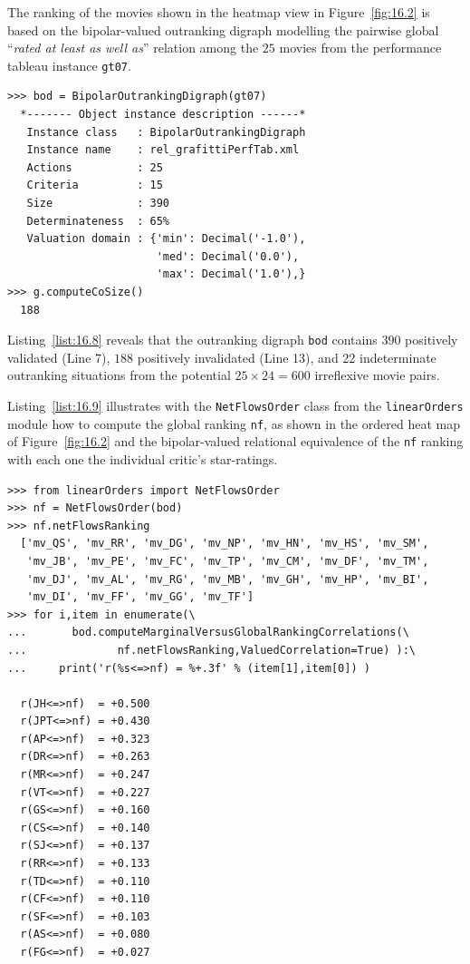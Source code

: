 The \NetFlows ranking of the movies shown in the heatmap view in Figure~\vref{fig:16.2} is based on the bipolar-valued outranking digraph modelling the pairwise global ``\emph{rated at least as well as}'' relation among the $25$ movies from the performance tableau instance \texttt{gt07}.
\begin{lstlisting}[caption={The bipolar-valued outranking digraph of the star-rated movies},label=list:16.8]
>>> bod = BipolarOutrankingDigraph(gt07)
  *------- Object instance description ------*
   Instance class   : BipolarOutrankingDigraph
   Instance name    : rel_grafittiPerfTab.xml
   Actions          : 25
   Criteria         : 15
   Size             : 390
   Determinateness  : 65%
   Valuation domain : {'min': Decimal('-1.0'),
                       'med': Decimal('0.0'),
                       'max': Decimal('1.0'),}
>>> g.computeCoSize()
  188
\end{lstlisting}

Listing~\vref{list:16.8} reveals that the outranking digraph \texttt{bod} contains $390$ positively validated (Line 7), $188$ positively invalidated (Line 13), and 22 indeterminate outranking situations from the potential $25 \times 24 = 600$ irreflexive movie pairs.

Listing~\vref{list:16.9} illustrates with the \texttt{NetFlowsOrder} class  from the \texttt{linearOr\-ders} module how to compute the global \NetFlows ranking \texttt{nf}, as shown in the ordered heat map of Figure~\vref{fig:16.2} and the bipolar-valued relational equivalence of the \texttt{nf} ranking with each one the individual critic's star-ratings.
\begin{lstlisting}[caption={Computing marginal criterion correlations with global \NetFlows ranking},label=list:16.9]
>>> from linearOrders import NetFlowsOrder
>>> nf = NetFlowsOrder(bod)
>>> nf.netFlowsRanking
  ['mv_QS', 'mv_RR', 'mv_DG', 'mv_NP', 'mv_HN', 'mv_HS', 'mv_SM',
   'mv_JB', 'mv_PE', 'mv_FC', 'mv_TP', 'mv_CM', 'mv_DF', 'mv_TM',
   'mv_DJ', 'mv_AL', 'mv_RG', 'mv_MB', 'mv_GH', 'mv_HP', 'mv_BI',
   'mv_DI', 'mv_FF', 'mv_GG', 'mv_TF']
>>> for i,item in enumerate(\
...       bod.computeMarginalVersusGlobalRankingCorrelations(\
...              nf.netFlowsRanking,ValuedCorrelation=True) ):\
...     print('r(%s<=>nf) = %+.3f' % (item[1],item[0]) )   

  r(JH<=>nf)  = +0.500
  r(JPT<=>nf) = +0.430
  r(AP<=>nf)  = +0.323
  r(DR<=>nf)  = +0.263
  r(MR<=>nf)  = +0.247
  r(VT<=>nf)  = +0.227
  r(GS<=>nf)  = +0.160
  r(CS<=>nf)  = +0.140
  r(SJ<=>nf)  = +0.137
  r(RR<=>nf)  = +0.133
  r(TD<=>nf)  = +0.110
  r(CF<=>nf)  = +0.110
  r(SF<=>nf)  = +0.103
  r(AS<=>nf)  = +0.080
  r(FG<=>nf)  = +0.027
\end{lstlisting}

